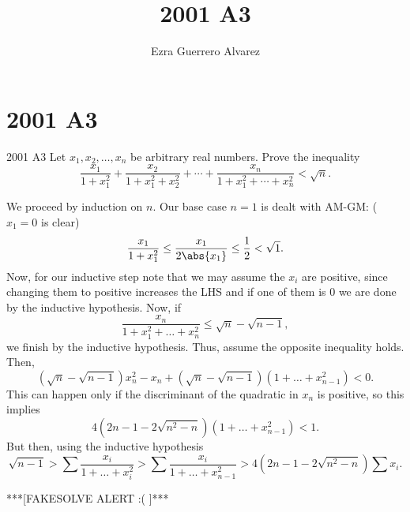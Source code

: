 \documentclass[14pt]{article}
\title{2001 A3}
\author{Ezra Guerrero Alvarez}
\begin{document}
\maketitle
	
\section*{2001 A3}

\begin{statement}{2001 A3}
	Let $x_1,x_2,\ldots,x_n$ be arbitrary real numbers. Prove the inequality
	\[
	\frac{x_1}{1+x_1^2} + \frac{x_2}{1+x_1^2 + x_2^2} + \cdots +
	\frac{x_n}{1 + x_1^2 + \cdots + x_n^2} < \sqrt{n}.
	\]
\end{statement}
We proceed by induction on $n$. Our base case $n=1$ is dealt with AM-GM: ($x_1=0$ is clear)
\[ \frac{x_1}{1+x_1^2}\le\frac{x_1}{2\abs{x_1}}\le\frac12<\sqrt1. \]
Now, for our inductive step note that we may assume the $x_i$ are positive, since changing them to positive increases the LHS and if one of them is $0$ we are done by the inductive hypothesis. Now, if
\[ \frac{x_n}{1+x_1^2+\ldots+x_n^2}\le\sqrt n-\sqrt{n-1}, \]
we finish by the inductive hypothesis. Thus, assume the opposite inequality holds. Then,
\[ (\sqrt n-\sqrt{n-1})x_n^2-x_n+(\sqrt n-\sqrt{n-1})(1+\ldots+x_{n-1}^2)<0. \]
This can happen only if the discriminant of the quadratic in $x_n$ is positive, so this implies
\[ 4(2n-1-2\sqrt{n^2-n})(1+\ldots+x_{n-1}^2)<1. \]
But then, using the inductive hypothesis
\[ \sqrt{n-1}>\sum\frac{x_i}{1+\ldots+x_i^2}>\sum\frac{x_i}{1+\ldots+x_{n-1}^2}>4(2n-1-2\sqrt{n^2-n})\sum x_i. \]

***[FAKESOLVE ALERT :( ]***
	
\end{document}
